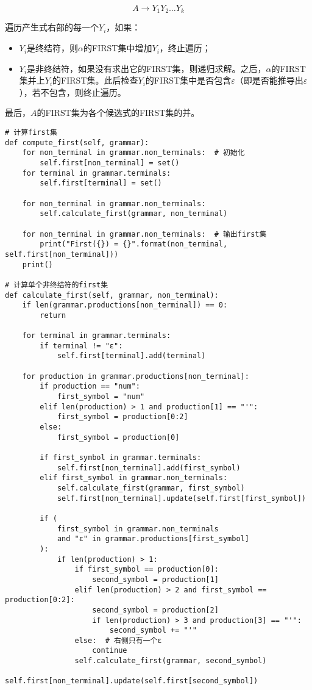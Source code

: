 \documentclass[lang=cn,11pt,a4paper]{elegantpaper}
\begin{document}
$$
A\rightarrow Y_1Y_2\ldots Y_k
$$

遍历产生式右部的每一个$Y_i$，如果：

\begin{itemize}
    \item $Y_i$是终结符，则$\alpha$的FIRST集中增加$Y_i$，终止遍历；
    \item $Y_i$是非终结符，如果没有求出它的FIRST集，则递归求解。之后，$\alpha$的FIRST集并上$Y_i$的FIRST集。此后检查$Y_i$的FIRST集中是否包含$\varepsilon$（即是否能推导出$\varepsilon$），若不包含，则终止遍历。
\end{itemize}

最后，$A$的FIRST集为各个候选式的FIRST集的并。
\begin{lstlisting}
# 计算first集
def compute_first(self, grammar):
    for non_terminal in grammar.non_terminals:  # 初始化
        self.first[non_terminal] = set()
    for terminal in grammar.terminals:
        self.first[terminal] = set()

    for non_terminal in grammar.non_terminals:
        self.calculate_first(grammar, non_terminal)

    for non_terminal in grammar.non_terminals:  # 输出first集
        print("First({}) = {}".format(non_terminal, self.first[non_terminal]))
    print()

# 计算单个非终结符的first集
def calculate_first(self, grammar, non_terminal):
    if len(grammar.productions[non_terminal]) == 0:
        return

    for terminal in grammar.terminals:
        if terminal != "ε":
            self.first[terminal].add(terminal)

    for production in grammar.productions[non_terminal]:
        if production == "num":
            first_symbol = "num"
        elif len(production) > 1 and production[1] == "'":
            first_symbol = production[0:2]
        else:
            first_symbol = production[0]

        if first_symbol in grammar.terminals:
            self.first[non_terminal].add(first_symbol)
        elif first_symbol in grammar.non_terminals:
            self.calculate_first(grammar, first_symbol)
            self.first[non_terminal].update(self.first[first_symbol])

        if (
            first_symbol in grammar.non_terminals
            and "ε" in grammar.productions[first_symbol]
        ):
            if len(production) > 1:
                if first_symbol == production[0]:
                    second_symbol = production[1]
                elif len(production) > 2 and first_symbol == production[0:2]:
                    second_symbol = production[2]
                    if len(production) > 3 and production[3] == "'":
                        second_symbol += "'"
                else:  # 右侧只有一个ε
                    continue
                self.calculate_first(grammar, second_symbol)
                self.first[non_terminal].update(self.first[second_symbol])

\end{lstlisting}
\end{document}
